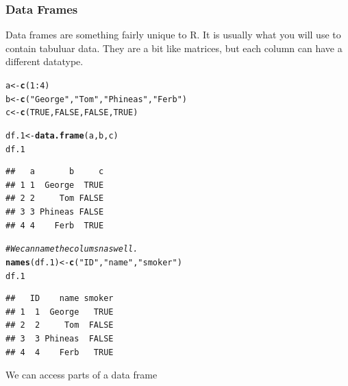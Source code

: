 \documentclass{article}\usepackage[]{graphicx}\usepackage[]{color}
\makeatletter
\newcommand{\hlnum}[1]{\textcolor[rgb]{0.686,0.059,0.569}{#1}}%
\newcommand{\hlstr}[1]{\textcolor[rgb]{0.192,0.494,0.8}{#1}}%
\newcommand{\hlcom}[1]{\textcolor[rgb]{0.678,0.584,0.686}{\textit{#1}}}%
\newcommand{\hlopt}[1]{\textcolor[rgb]{0,0,0}{#1}}%
\newcommand{\hlstd}[1]{\textcolor[rgb]{0.345,0.345,0.345}{#1}}%
\newcommand{\hlkwb}[1]{\textcolor[rgb]{0.69,0.353,0.396}{#1}}%
\newcommand{\hlkwd}[1]{\textcolor[rgb]{0.737,0.353,0.396}{\textbf{#1}}}%
\newenvironment{kframe}{%
 \def\at@end@of@kframe{}%
 \ifinner\ifhmode%
  \def\at@end@of@kframe{\end{minipage}}%
  \begin{minipage}{\columnwidth}%
 \fi\fi%
 \def\FrameCommand##1{\hskip\@totalleftmargin \hskip-\fboxsep
 \colorbox{shadecolor}{##1}\hskip-\fboxsep
     \hskip-\linewidth \hskip-\@totalleftmargin \hskip\columnwidth}%
 \MakeFramed {\advance\hsize-\width
   \@totalleftmargin\z@ \linewidth\hsize
   \@setminipage}}%
 {\par\unskip\endMakeFramed%
 \at@end@of@kframe}
\newenvironment{knitrout}{}{} %
\makeatother
\begin{document}
    \subsubsection*{Data Frames}
    Data frames are something fairly unique to R. It is usually what  you will
    use to contain tabuluar data. They are a bit like matrices, but each column 
    can have a different datatype. 
    
\begin{knitrout}
\color{fgcolor}\begin{kframe}
\begin{alltt}
  \hlstd{a} \hlkwb{<-} \hlkwd{c}\hlstd{(}\hlnum{1}\hlopt{:}\hlnum{4}\hlstd{)}
  \hlstd{b} \hlkwb{<-} \hlkwd{c}\hlstd{(}\hlstr{"George"}\hlstd{,} \hlstr{"Tom"}\hlstd{,} \hlstr{"Phineas"}\hlstd{,} \hlstr{"Ferb"}\hlstd{)}
  \hlstd{c} \hlkwb{<-} \hlkwd{c}\hlstd{(}\hlnum{TRUE}\hlstd{,} \hlnum{FALSE}\hlstd{,} \hlnum{FALSE}\hlstd{,} \hlnum{TRUE}\hlstd{)}

  \hlstd{df.1} \hlkwb{<-} \hlkwd{data.frame}\hlstd{(a, b, c)}
  \hlstd{df.1}
\end{alltt}
\begin{verbatim}
##   a       b     c
## 1 1  George  TRUE
## 2 2     Tom FALSE
## 3 3 Phineas FALSE
## 4 4    Ferb  TRUE
\end{verbatim}
\begin{alltt}
  \hlcom{# We can name the columsn as well.}
  \hlkwd{names}\hlstd{(df.1)} \hlkwb{<-} \hlkwd{c}\hlstd{(}\hlstr{"ID"}\hlstd{,} \hlstr{"name"}\hlstd{,} \hlstr{"smoker"}\hlstd{)}
  \hlstd{df.1}
\end{alltt}
\begin{verbatim}
##   ID    name smoker
## 1  1  George   TRUE
## 2  2     Tom  FALSE
## 3  3 Phineas  FALSE
## 4  4    Ferb   TRUE
\end{verbatim}
\end{kframe}
\end{knitrout}
    
    We can access parts of a data frame
    
\end{document}

